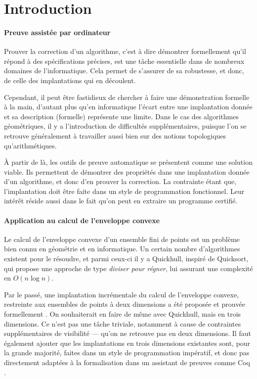 \documentclass[]{article}
\begin{document}
\pagebreak
\tableofcontents

\pagebreak
\section{Introduction}
\paragraph{Preuve assistée par ordinateur}
Prouver la correction d'un algorithme, c'est à dire démontrer formellement qu'il répond à des spécifications précises, est une tâche essentielle dans de nombreux domaines de l'informatique. Cela permet de s'assurer de sa robustesse, et donc, de celle des implantations qui en découlent.

Cependant, il peut être fastidieux de chercher à faire une démonstration formelle à la main, d'autant plus qu'en informatique l'écart entre une implantation donnée et sa description (formelle) représente une limite. Dans le cas des algorithmes géométriques, il y a l'introduction de difficultés supplémentaires, puisque l'on se retrouve généralement à travailler aussi bien sur des notions topologiques qu'arithmétiques.

À partir de là, les outils de preuve automatique se présentent comme une solution viable. Ils permettent de démontrer des propriétés dans une implantation donnée d'un algorithme, et donc d'en prouver la correction. La contrainte étant que, l'implantation doit être faite dans un style de programmation fonctionnel. Leur intérêt réside aussi dans le fait qu'on peut en extraire un programme certifié.

\paragraph{Application au calcul de l'enveloppe convexe}
Le calcul de l'enveloppe convexe d'un ensemble fini de points est un problème bien connu en géométrie et en informatique. Un certain nombre d'algorithmes existent pour le résoudre, et parmi ceux-ci il y a Quickhull, inspiré de Quicksort, qui propose une approche de type \emph{diviser pour régner}, lui assurant une complexité en $O(n\log{n})$.

Par le passé, une implantation incrémentale du calcul de l'enveloppe convexe, restreinte aux ensembles de points à deux dimensions a été proposée et prouvée formellement \cite{brun:hal-00955400, brun:hal-00916880}. On souhaiterait en faire de même avec Quickhull, mais en trois dimensions. Ce n'est pas une tâche triviale, notamment à cause de contraintes supplémentaires de visibilité — qu'on ne retrouve pas en deux dimensions. Il faut également ajouter que les implantations en trois dimensions existantes sont, pour la grande majorité, faites dans un style de programmation impératif, et donc pas directement adaptées à la formalisation dans un assistant de preuves comme Coq \cite{coqref, casteran:hal-00344237}.
\end{document}
